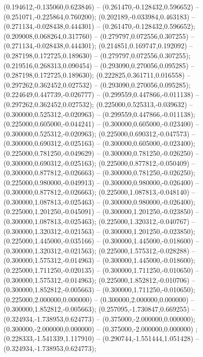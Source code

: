  (0.194612,-0.135060,0.623846) -- (0.261470,-0.128432,0.596652) -- (0.251071,-0.225864,0.760200);
 (0.202189,-0.033984,0.463183) -- (0.271134,-0.028438,0.444301) -- (0.261470,-0.128432,0.596652);
 (0.209008,0.068264,0.317760) -- (0.279797,0.072556,0.307255) -- (0.271134,-0.028438,0.444301);
 (0.214851,0.169747,0.192092) -- (0.287198,0.172725,0.189630) -- (0.279797,0.072556,0.307255);
 (0.219516,0.268313,0.090454) -- (0.293090,0.270056,0.095285) -- (0.287198,0.172725,0.189630);
 (0.222825,0.361711,0.016558) -- (0.297262,0.362452,0.027532) -- (0.293090,0.270056,0.095285);
 (0.224649,0.447739,-0.026777) -- (0.299559,0.447866,-0.011138) -- (0.297262,0.362452,0.027532);
 (0.225000,0.525313,-0.039632) -- (0.300000,0.525312,-0.020963) -- (0.299559,0.447866,-0.011138);
 (0.225000,0.605000,-0.044241) -- (0.300000,0.605000,-0.023400) -- (0.300000,0.525312,-0.020963);
 (0.225000,0.690312,-0.047573) -- (0.300000,0.690312,-0.025163) -- (0.300000,0.605000,-0.023400);
 (0.225000,0.781250,-0.049629) -- (0.300000,0.781250,-0.026250) -- (0.300000,0.690312,-0.025163);
 (0.225000,0.877812,-0.050409) -- (0.300000,0.877812,-0.026663) -- (0.300000,0.781250,-0.026250);
 (0.225000,0.980000,-0.049913) -- (0.300000,0.980000,-0.026400) -- (0.300000,0.877812,-0.026663);
 (0.225000,1.087813,-0.048140) -- (0.300000,1.087813,-0.025463) -- (0.300000,0.980000,-0.026400);
 (0.225000,1.201250,-0.045091) -- (0.300000,1.201250,-0.023850) -- (0.300000,1.087813,-0.025463);
 (0.225000,1.320312,-0.040767) -- (0.300000,1.320312,-0.021563) -- (0.300000,1.201250,-0.023850);
 (0.225000,1.445000,-0.035166) -- (0.300000,1.445000,-0.018600) -- (0.300000,1.320312,-0.021563);
 (0.225000,1.575312,-0.028288) -- (0.300000,1.575312,-0.014963) -- (0.300000,1.445000,-0.018600);
 (0.225000,1.711250,-0.020135) -- (0.300000,1.711250,-0.010650) -- (0.300000,1.575312,-0.014963);
 (0.225000,1.852812,-0.010706) -- (0.300000,1.852812,-0.005663) -- (0.300000,1.711250,-0.010650);
 (0.225000,2.000000,0.000000) -- (0.300000,2.000000,0.000000) -- (0.300000,1.852812,-0.005663);
 (0.257095,-1.730847,0.669255) -- (0.324934,-1.738953,0.624773) -- (0.375000,-2.000000,0.000000);
 (0.300000,-2.000000,0.000000) -- (0.375000,-2.000000,0.000000) ;
 (0.228333,-1.541339,1.117910) -- (0.290744,-1.551444,1.051428) -- (0.324934,-1.738953,0.624773);
